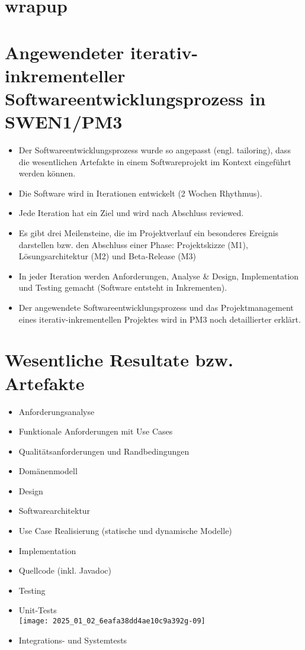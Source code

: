 \section{wrapup}

\section*{Angewendeter iterativ-inkrementeller Softwareentwicklungsprozess in SWEN1/PM3}
\begin{itemize}
  \item Der Softwareentwicklungsprozess wurde so angepasst (engl. tailoring), dass die wesentlichen Artefakte in einem Softwareprojekt im Kontext eingeführt werden können.
  \item Die Software wird in Iterationen entwickelt (2 Wochen Rhythmus).
  \item Jede Iteration hat ein Ziel und wird nach Abschluss reviewed.
  \item Es gibt drei Meilensteine, die im Projektverlauf ein besonderes Ereignis darstellen bzw. den Abschluss einer Phase: Projektskizze (M1), Lösungsarchitektur (M2) und Beta-Release (M3)
  \item In jeder Iteration werden Anforderungen, Analyse \& Design, Implementation und Testing gemacht (Software entsteht in Inkrementen).
  \item Der angewendete Softwareentwicklungsprozess und das Projektmanagement eines iterativ-inkrementellen Projektes wird in PM3 noch detaillierter erklärt.
\end{itemize}

\section*{Wesentliche Resultate bzw. Artefakte}
\begin{itemize}
  \item Anforderungsanalyse
  \item Funktionale Anforderungen mit Use Cases
  \item Qualitätsanforderungen und Randbedingungen
  \item Domänenmodell
  \item Design
  \item Softwarearchitektur
  \item Use Case Realisierung (statische und dynamische Modelle)
  \item Implementation
  \item Quellcode (inkl. Javadoc)
  \item Testing
  \item Unit-Tests\\
\texttt{[image: 2025\_01\_02\_6eafa38dd4ae10c9a392g-09]}
  \item Integrations- und Systemtests
\end{itemize}

